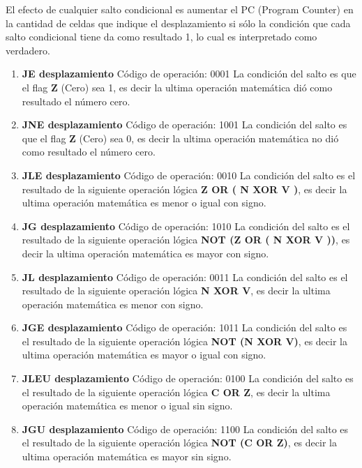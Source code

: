 El efecto de cualquier salto condicional es aumentar el PC (Program Counter) en la cantidad de celdas que indique el desplazamiento si sólo la condición que cada salto condicional tiene da como resultado 1, lo cual es interpretado como verdadero.

\begin{enumerate}
\item \textbf{JE desplazamiento}
Código de operación: 0001
La condición del salto es que el flag \textbf{Z} (Cero) sea 1, es decir la ultima operación matemática dió como resultado el número cero.

\item \textbf{JNE desplazamiento}
Código de operación: 1001
La condición del salto es que el flag \textbf{Z} (Cero) sea 0, es decir la ultima operación matemática no dió como resultado el número cero.

\item \textbf{JLE desplazamiento}
Código de operación: 0010
La condición del salto es el resultado de la siguiente operación lógica \textbf{Z OR ( N XOR V )}, es decir la ultima operación matemática es menor o igual con signo.

\item \textbf{JG desplazamiento}
Código de operación: 1010
La condición del salto es el resultado de la siguiente operación lógica \textbf{NOT (Z OR ( N XOR V ))}, es decir la ultima operación matemática es mayor con signo.

\item \textbf{JL desplazamiento}
Código de operación: 0011
La condición del salto es el resultado de la siguiente operación lógica \textbf{N XOR V}, es decir la ultima operación matemática es menor con signo.

\item \textbf{JGE desplazamiento}
Código de operación: 1011
La condición del salto es el resultado de la siguiente operación lógica \textbf{NOT (N XOR V)}, es decir la ultima operación matemática es mayor o igual con signo.

\item \textbf{JLEU desplazamiento}
Código de operación: 0100
La condición del salto es el resultado de la siguiente operación lógica \textbf{C OR Z}, es decir la ultima operación matemática es menor o igual sin signo.

\item \textbf{JGU desplazamiento}
Código de operación: 1100
La condición del salto es el resultado de la siguiente operación lógica \textbf{NOT (C OR Z)}, es decir la ultima operación matemática es mayor sin signo.


\end{enumerate}
